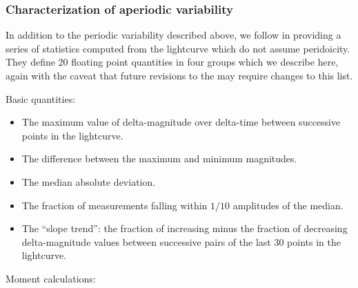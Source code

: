 \subsubsection{Characterization of aperiodic variability}

In addition to the periodic variability described above, we follow \cite{Richards11} in providing a series of statistics computed from the lightcurve which do not assume peridoicity. They define 20 floating point quantities in four groups which we describe here, again with the caveat that future revisions to the \DPDD{} may require changes to this list.

Basic quantities:

\begin{itemize}
\item{The maximum value of delta-magnitude over delta-time between successive points in the lightcurve.}
\item{The difference between the maximum and minimum magnitudes.}
\item{The median absolute deviation.}
\item{The fraction of measurements falling within $1/10$ amplitudes of the median.}
\item{The ``slope trend'': the fraction of increasing minus the fraction of decreasing delta-magnitude values between successive pairs of the last 30 points in the lightcurve.}
\end{itemize}

Moment calculations:

